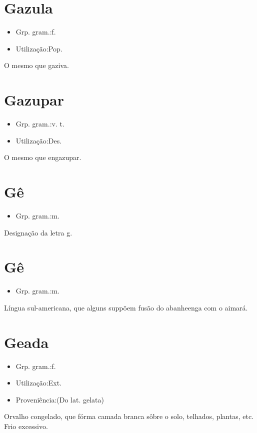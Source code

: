 \section{Gazula}
\begin{itemize}
\item {Grp. gram.:f.}
\end{itemize}
\begin{itemize}
\item {Utilização:Pop.}
\end{itemize}
O mesmo que \textunderscore gaziva\textunderscore .
\section{Gazupar}
\begin{itemize}
\item {Grp. gram.:v. t.}
\end{itemize}
\begin{itemize}
\item {Utilização:Des.}
\end{itemize}
O mesmo que \textunderscore engazupar\textunderscore .
\section{Gê}
\begin{itemize}
\item {Grp. gram.:m.}
\end{itemize}
Designação da letra \textunderscore g\textunderscore .
\section{Gê}
\begin{itemize}
\item {Grp. gram.:m.}
\end{itemize}
Língua sul-americana, que alguns suppõem fusão do abanheenga com o aimará.
\section{Geada}
\begin{itemize}
\item {Grp. gram.:f.}
\end{itemize}
\begin{itemize}
\item {Utilização:Ext.}
\end{itemize}
\begin{itemize}
\item {Proveniência:(Do lat. \textunderscore gelata\textunderscore )}
\end{itemize}
Orvalho congelado, que fórma camada branca sôbre o solo, telhados, plantas, etc.
Frio excessivo.
